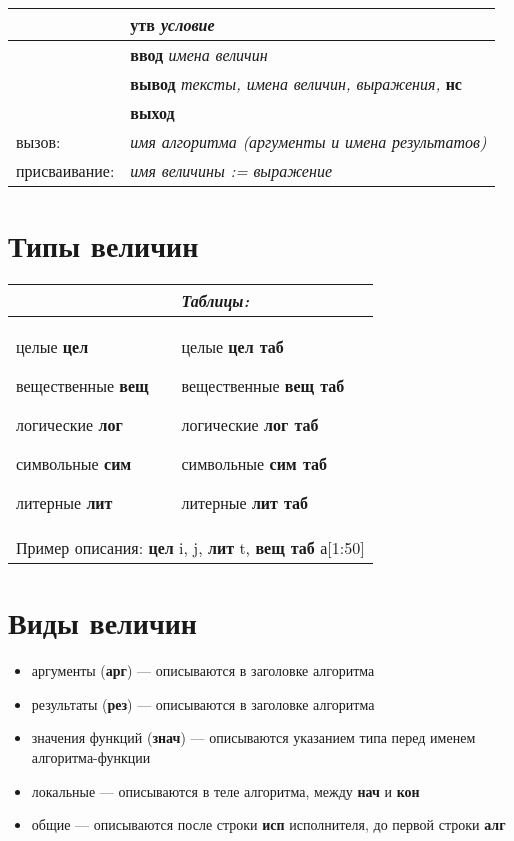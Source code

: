 \begin{center}
\begin{tabular}{||l|l||}
\hline
\hline
 & \textbf{утв} \textit{условие}\\
\hline
 & \textbf{ввод} \textit{имена величин}\\
\hline
 & \textbf{вывод} \textit{тексты, имена величин, выражения,} \textbf{нс}\\
\hline
 & \textbf{выход}\\
\hline
\textrm{вызов:} & \textit{имя алгоритма (аргументы и имена результатов)}\\
\hline
\textrm{присваивание:} & \textit{имя величины := выражение}\\
\hline
\hline
\end{tabular}
\end{center}

\normalfont

\section{Типы величин}

\begin{center}
\begin{tabular}{||p{5cm}|p{5cm}||}
\hline
\hline
 & \textit{Таблицы:}\\
\hline
целые \textbf{цел} 

вещественные \textbf{вещ} 

логические \textbf{лог} 

символьные \textbf{сим} 

литерные \textbf{лит} &
целые \textbf{цел таб} 

вещественные \textbf{вещ таб} 

логические \textbf{лог таб} 

символьные \textbf{сим таб} 

литерные \textbf{лит таб}\\
\hline
\multicolumn{2}{||c||}{Пример описания: \sffamily \textbf{цел} i, j, \textbf{лит} t, \textbf{вещ таб} а[1:50]}\\
\hline
\hline
\end{tabular}
\end{center}

\section{Виды величин}
\begin{itemize}
\item аргументы (\textbf{арг}) --- описываются в заголовке алгоритма 
\item результаты (\textbf{рез}) --- описываются в заголовке алгоритма 
\item значения функций (\textbf{знач}) --- описываются указанием типа перед именем ал\-го\-рит\-ма-функ\-ции
\item локальные --- описываются в теле алгоритма, между \textbf{нач} и \textbf{кон}
\item общие --- описываются после строки \textbf{исп} исполнителя, до первой строки \textbf{алг}
\end{itemize}

